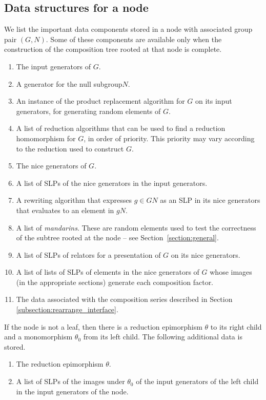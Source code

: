 \documentclass[12pt,twoside,reqno,psamsfonts]{amsproc}
\newcommand{\nullsubgp}{{null subgroup}\xspace}
\numberwithin{equation}{section}
\numberwithin{figure}{section}
\newcounter{algorithm}
\theoremstyle{plain}
\theoremstyle{definition}
\theoremstyle{remark}
\begin{document}
\subsection{Data structures for a node}\label{section:datastructures}
We list the important data components stored in a node with
associated group pair $(G,N)$.  Some of these components are available 
only when the construction of the composition tree rooted at that node is complete.
\begin{enumerate}
\item The input generators of $G$.
\item A generator for the \nullsubgp $N$.
\item An instance of the product replacement algorithm for $G$ on its input
generators, for generating random elements of $G$. 
\item A list of reduction algorithms that can be used to find a
  reduction homomorphism for $G$, in order of priority.
  This priority may vary according to the reduction used 
  to construct $G$. 
\item The nice generators of $G$.
\item A list of SLPs of the nice generators in the input generators.
\item A rewriting algorithm that expresses $g \in GN$ as an
SLP in its nice generators that evaluates to an element in $gN$.
\item A list of {\it mandarins}. These are random elements used to test the
correctness of the subtree rooted at the node --
see Section~\ref{section:general}.
\item A list of SLPs of relators for a presentation of $G$ on its 
nice generators.
\item A list of lists of SLPs of elements in the nice generators 
of $G$ whose images (in the appropriate sections) generate each 
composition factor. 
\item The data associated with the composition series
described in Section \ref{subsection:rearrange_interface}.
\end{enumerate}

If the node is not a leaf, then there is a reduction epimorphism
$\theta$ to its right child and a monomorphism $\theta_0$ from its left child.
The following additional data is stored.
\begin{enumerate}
\item The reduction epimorphism $\theta$.
\item A list of SLPs of the images under $\theta_0$ of the input 
generators of the left child in the input generators of the node.
\end{enumerate}
\end{document}
